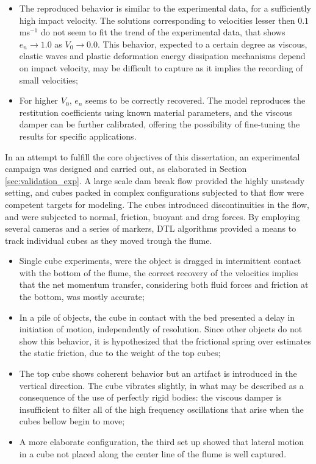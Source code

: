 \begin{itemize}
\item The reproduced behavior is similar to the experimental data, for a sufficiently high impact velocity. The solutions corresponding to velocities lesser then $0.1$ ms$^{-1}$ do not seem to fit the trend of the experimental data, that shows $e_n\rightarrow1.0$ as $V_0\rightarrow0.0$. This behavior, expected to a certain degree as viscous, elastic waves and plastic deformation energy dissipation mechanisms depend on impact velocity, may be difficult to capture as it implies the recording of small velocities;
\item For higher $V_0$, $e_n$ seems to be correctly recovered. The model reproduces the restitution coefficients using known material parameters, and the viscous damper can be further calibrated, offering the possibility of fine-tuning the results for specific applications.
\end{itemize}

In an attempt to fulfill the core objectives of this dissertation, an experimental campaign was designed and carried out, as elaborated in Section \ref{sec:validation_exp}. A large scale dam break flow provided the highly unsteady setting, and cubes packed in complex configurations subjected to that flow were competent targets for modeling. The cubes introduced discontinuities in the flow, and were subjected to normal, friction, buoyant and drag forces. By employing several cameras and a series of markers, \ac{DTL} algorithms provided a means to track individual cubes as they moved trough the flume. 

\begin{itemize}
\item Single cube experiments, were the object is dragged in intermittent contact with the bottom of the flume, the correct recovery of the velocities implies that the net momentum transfer, considering both fluid forces and friction at the bottom, was mostly accurate;
\item In a pile of objects, the cube in contact with the bed presented a delay in initiation of motion, independently of resolution. Since other objects do not show this behavior, it is hypothesized that the frictional spring over estimates the static friction, due to the weight of the top cubes;
\item The top cube shows coherent behavior but an artifact is introduced in the vertical direction. The cube vibrates slightly, in what may be described as a consequence of the use of perfectly rigid bodies: the viscous damper is insufficient to filter all of the high frequency oscillations that arise when the cubes bellow begin to move;
\item A more elaborate configuration, the third set up showed that lateral motion in a cube not placed along the center line of the flume is well captured. 
\end{itemize}

